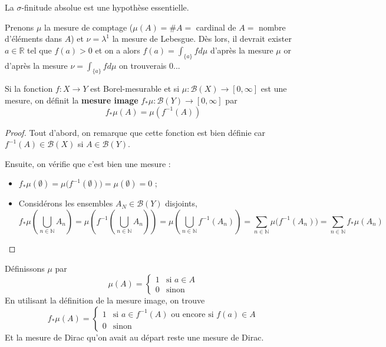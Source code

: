 \begin{remark}
    La $\sigma$-finitude absolue est une hypothèse essentielle.
\end{remark}
\begin{example}
    Prenons $\mu$ la mesure de comptage ($\mu(A)=\#A=$ cardinal de $A=$ nombre d'éléments dans $A$) et $\nu=\lambda^1$ la mesure de Lebesgue. Dès lors, il devrait exister $a\in\mathbb{R}$ tel que $f(a)>0$ et on a alors $f(a)=\int_{\{a\}}fd\mu$ d'après la mesure $\mu$ or d'après la mesure $\nu=\int_{\{a\}}fd\mu$ on trouverais $0$...
\end{example}

\begin{definition}
    Si la fonction $f:X\to Y$ est Borel-mesurable et si $\mu:\mathscr{B}(X)\to[0,\infty]$ est une mesure, on définit la \textbf{mesure image} $f_*\mu:\mathscr{B}(Y)\to[0,\infty]$ par
    \begin{equation*}
        f_*\mu(A)=\mu\left(f^{-1}(A)\right)
    \end{equation*}
\end{definition}
\begin{proof}
    Tout d'abord, on remarque que cette fonction est bien définie car $f^{-1}(A)\in\mathscr{B}(X)$ si $A\in\mathscr{B}(Y)$.
    
    Ensuite, on vérifie que c'est bien une mesure :
    \begin{itemize}
        \item $f_*\mu(\emptyset)=\mu\big(f^{-1}(\emptyset)\big)=\mu(\emptyset)=0$ ;
        \item Considérons les ensembles $A_N\in\mathscr{B}(Y)$ disjoints,
        \begin{equation*}
            f_*\mu\left(\bigcup_{n\in\mathbb{N}}A_n\right)=\mu\left(f^{-1}\left(\bigcup_{n\in\mathbb{N}}A_n\right)\right)=\mu\left(\bigcup_{n\in\mathbb{N}}f^{-1}(A_n)\right) = \sum_{n\in\mathbb{N}}\mu\big(f^{-1}(A_n)\big) = \sum_{n\in\mathbb{N}}f_*\mu(A_n)
        \end{equation*}
    \end{itemize}
\end{proof}

\begin{example}
    Définissons $\mu$ par
    \begin{equation*}
        \mu(A) = \left\{\begin{array}{ll}
            1 & \text{si $a\in A$} \\
            0 & \text{sinon}
        \end{array}\right.
    \end{equation*}
    En utilisant la définition de la mesure image, on trouve
    \begin{equation*}
        f_*\mu(A) = \left\{\begin{array}{ll}
            1 & \text{si $a \in f^{-1}(A)$ ou encore si $f(a)\in A$} \\
            0 & \text{sinon}
        \end{array}\right.
    \end{equation*}
    Et la mesure de Dirac qu'on avait au départ reste une mesure de Dirac.
\end{example}

